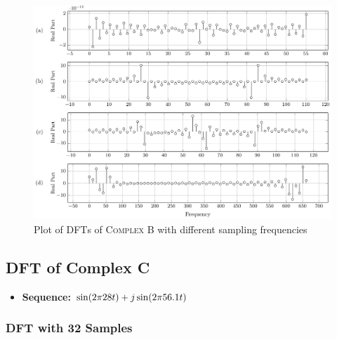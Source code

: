 \documentclass[../../course]{subfiles}
\begin{document}
\vfill

\begin{figure} [H]
    \centering
     {
        \includegraphics[height = 0.8\textheight] {tikzpics/plotDftComplexB64.pdf}
    }
     {Plot of \textsc{DFT}s of \textsc{Complex B} with different sampling frequencies}
    \label{plt:dftComplexB}
\end{figure}

\pagebreak

\subsection{DFT of Complex C} \label{ssec:dtftCplxC}

\begin{itemize} [label=]

    \item \textbf{Sequence:} $\sin(2 \pi 28 t) + j \sin(2 \pi 56.1 t)$

\end{itemize}

\subsubsection{DFT with 32 Samples}
\end{document}
